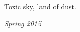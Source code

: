 Toxic sky, land of dust.

\begin{flushright}
\textit{Spring 2015}
\end{flushright}



\newpage
\groupendnotes

